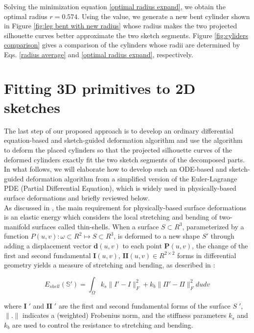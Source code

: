 \documentclass[runningheads]{llncs}
\begin{document}
Solving the minimization equation \eqref{optimal radius expand}, we obtain the optimal radius $r=0.574$. Using the value, we generate a new bent cylinder shown in Figure \ref{fig:leg bent with new radius} whose radius makes the two projected silhouette curves better approximate the two sketch segments. Figure \ref{fig:cyliders comparison} gives a comparison of the cylinders whose radii are determined by Eqs. \eqref{radius average} and \eqref{optimal radius expand}, respectively. 

\section{Fitting 3D primitives to 2D sketches}\label{Fitting 3D primitives to 2D sketches}
The last step of our proposed approach is to develop an ordinary differential equation-based and sketch-guided deformation algorithm and use the algorithm to deform the placed cylinders so that the projected silhouette curves of the deformed cylinders exactly fit the two sketch segments of the decomposed parts. In what follows, we will elaborate how to develop such an ODE-based and sketch-guided deformation algorithm from a simplified version of the Euler-Lagrange PDE (Partial Differential Equation), which is widely used in physically-based surface deformations and briefly reviewed below.\\
As discussed in \cite{botsch2008linear}, the main requirement for physically-based surface deformations is an elastic energy which considers the local stretching and bending of two-manifold surfaces called thin-shells. When a surface $S \subset R^3$, parameterized by a function $P(u, v): \omega \subset R^2 \mapsto S \subset R^3$, is deformed to a new shape $S'$ through adding a displacement vector $\textbf{d}(u, v)$ to each point $\textbf{P}(u, v)$, the change of the first and second fundamental $\textbf{I}(u, v)$, $\textbf{II}(u, v) \in R^{2 \times 2}$ forms in differential geometry \cite{do2017differential} yields a measure of stretching and bending, as described in \cite{terzopoulos1987elastically}:

\begin{equation}
    E_{shell}(\mathbb{S'}) = \int_{\Omega}k_s\|I'-I\|_F^2+k_b\|\Pi'-\Pi\|_F^2 dudv  
\label{energy}
\end{equation}

where $\textbf{I}\;'$ and $\textbf{II}\;'$ are the first and second fundamental forms of the surface $S\;'$, $\parallel . \parallel$  indicates a (weighted) Frobenius norm, and the stiffness parameters $k_{s}$ and $k_{b}$ are used to control the resistance to stretching and bending.
\end{document}
